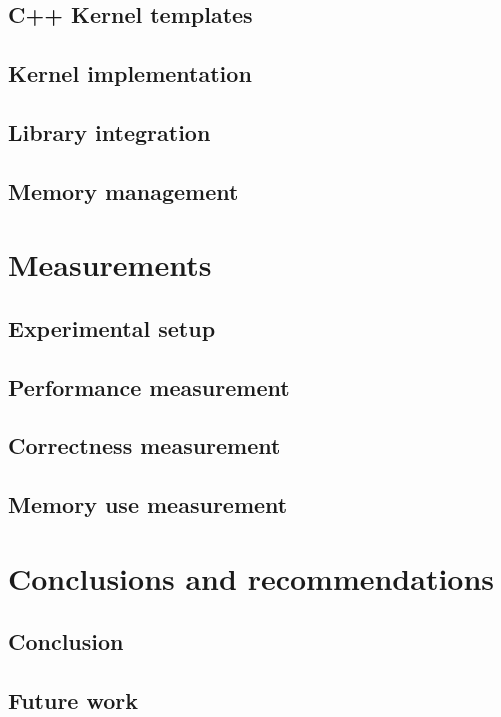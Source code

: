 \documentclass[whitelogo]{tudelft-report}
\begin{document}
\section{C++ Kernel templates}


\section{Kernel implementation}


\section{Library integration}


\section{Memory management}


\chapter{Measurements}
\label{chap:measurements}


\section{Experimental setup}


\section{Performance measurement}


\section{Correctness measurement}


\section{Memory use measurement}


\chapter{Conclusions and recommendations}
\label{chap:ccl}


\section{Conclusion}


\section{Future work}		


\appendix

%

%
\printbibliography
\end{document}
